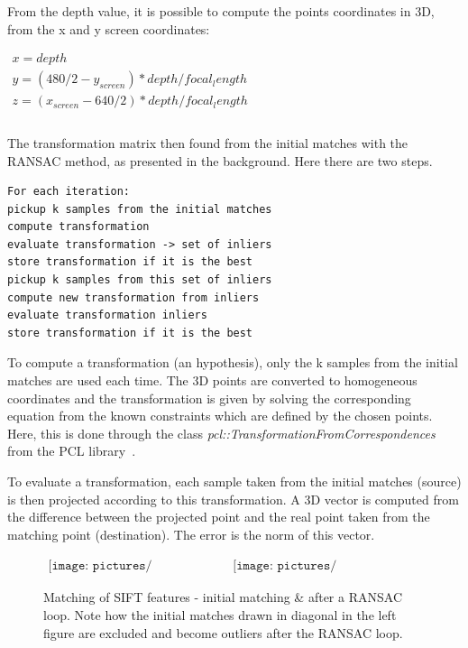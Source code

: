 From the depth value, it is possible to compute the points coordinates in 3D, from the x and y screen coordinates:

\(
\begin{array}{l}
x = depth \\
y = (480/2 - y_{screen}) * depth / focal_length \\
z = (x_{screen} - 640/2) * depth / focal_length \\
\end{array}
\)

\paragraph{}
The transformation matrix then found from the initial matches with the RANSAC method, as presented in the background. Here there are two steps.

\begin{verbatim}
For each iteration:
pickup k samples from the initial matches
compute transformation
evaluate transformation -> set of inliers
store transformation if it is the best
pickup k samples from this set of inliers
compute new transformation from inliers
evaluate transformation inliers
store transformation if it is the best
\end{verbatim}

To compute a transformation (an hypothesis), only the k samples from the initial matches are used each time. The 3D points are converted to homogeneous coordinates and the transformation is given by solving the corresponding equation from the known constraints which are defined by the chosen points. Here, this is done through the class \emph{pcl::TransformationFromCorrespondences} from the PCL library~\cite{Rusu_ICRA2011_PCL}.

To evaluate a transformation, each sample taken from the initial matches (source) is then projected according to this transformation. A 3D vector is computed from the difference between the projected point and the real point taken from the matching point (destination). The error is the norm of this vector.

\begin{figure}[h!]
\centering$
\begin{array}{cc}
\texttt{[image: pictures/sift\_matching\_init]} &
\texttt{[image: pictures/sift\_matching\_ransac]}
\end{array}$
\caption{Matching of SIFT features - initial matching \& after a RANSAC loop. Note how the initial matches drawn in diagonal in the left figure are excluded and become outliers after the RANSAC loop.}
\end{figure}

